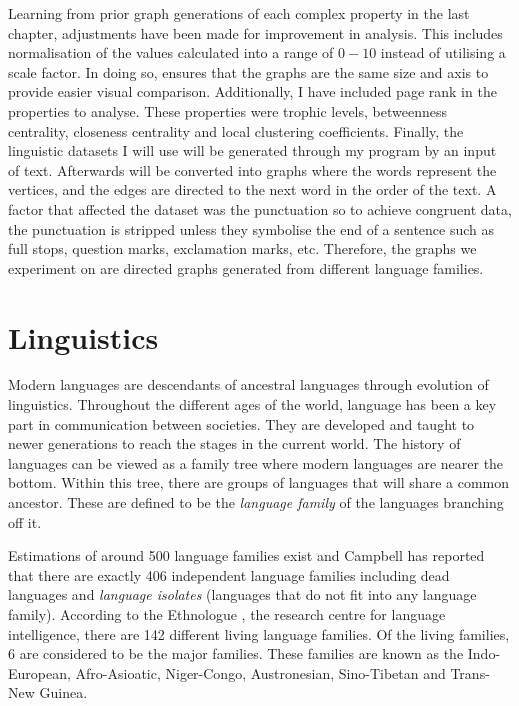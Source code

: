 Learning from prior graph generations of each complex property in the last chapter, adjustments have been made for improvement in analysis. This includes normalisation of the values calculated into a range of $0-10$ instead of utilising a scale factor. In doing so, ensures that the graphs are the same size and axis to provide easier visual comparison. Additionally, I have included page rank in the properties to analyse. These properties were trophic levels, betweenness centrality, closeness centrality and local clustering coefficients. Finally, the linguistic datasets I will use will be generated through my program by an input of text. Afterwards will be converted into graphs where the words represent the vertices, and the edges are directed to the next word in the order of the text. A factor that affected the dataset was the punctuation so to achieve congruent data, the punctuation is stripped unless they symbolise the end of a sentence such as full stops, question marks, exclamation marks, etc. Therefore, the graphs we experiment on are directed graphs generated from different language families.

\section{Linguistics}
Modern languages are descendants of ancestral languages through evolution of linguistics. Throughout the different ages of the world, language has been a key part in communication between societies. They are developed and taught to newer generations to reach the stages in the current world. The history of languages can be viewed as a family tree where modern languages are nearer the bottom. Within this tree, there are groups of languages that will share a common ancestor. These are defined to be the \emph{language family} of the languages branching off it.

Estimations of around 500 language families exist and Campbell \cite{campbell2018many} has reported that there are exactly 406 independent language families including dead languages and \emph{language isolates} (languages that do not fit into any language family). According to the Ethnologue \cite{eberhard2023a}, the research centre for language intelligence, there are 142 different living language families. Of the living families, 6 are considered to be the major families. These families are known as the Indo-European, Afro-Asioatic, Niger-Congo, Austronesian, Sino-Tibetan and Trans-New Guinea.

